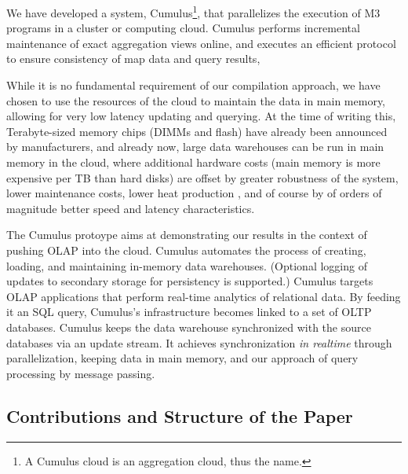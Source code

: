 We have developed a system, Cumulus\footnote{A Cumulus cloud is an
aggregation cloud, thus the name.}, that parallelizes the
execution of M3 programs in a cluster or computing cloud.
Cumulus performs incremental maintenance of exact aggregation views online, and
executes an efficient
protocol to ensure consistency of map data and query results,

While it is no fundamental requirement of our compilation
approach, we have chosen to use the resources of the cloud to maintain
the data in main memory, allowing for very low latency updating and querying.
At the time of writing this,
Terabyte-sized memory chips (DIMMs and flash) have already been announced by
manufacturers, and already now, large data warehouses
can be run in main memory in the cloud, where additional hardware costs
(main memory is more expensive per TB than hard disks) are
offset by greater robustness of the system, lower maintenance
costs, lower heat production \cite{1154557}, and of course by of orders
of magnitude better speed and latency characteristics.

The Cumulus protoype aims at demonstrating our results in the context of
pushing OLAP into the cloud.
Cumulus automates  the process of  creating, loading,
and  maintaining  in-memory  data  warehouses.
(Optional logging of updates to secondary storage
for persistency is supported.)
Cumulus targets OLAP applications  that perform real-time analytics of
relational data.  By feeding it an SQL query, Cumulus's infrastructure
becomes linked to  a set of OLTP databases.  Cumulus  keeps the
data warehouse synchronized with the source databases via an
update stream. It achieves synchronization {\em in realtime}
through parallelization, keeping data in main memory, and our approach of
query processing by message passing.


\subsection{Contributions and Structure of the Paper}


